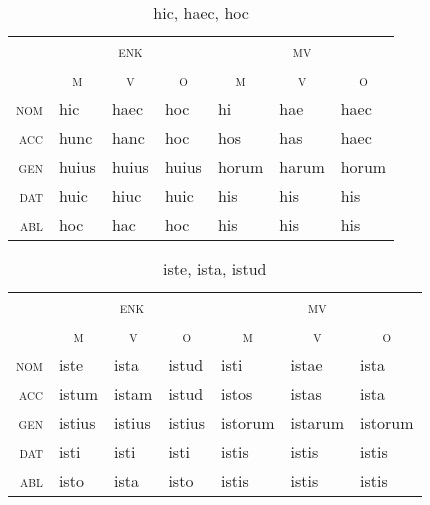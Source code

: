 \documentclass[12pt,a4paper]{article}
\begin{document}
\begin{table}[H]
\centering
\begin{tabular}{ r | l l l | l l l }
\toprule
 & \multicolumn{3}{c|}{\textsc{enk}} & \multicolumn{3}{c}{\textsc{mv}} \\
 & \multicolumn{1}{c}{\textsc{m}} & \multicolumn{1}{c}{\textsc{v}} & \multicolumn{1}{c|}{\textsc{o}} & \multicolumn{1}{c}{\textsc{m}} & \multicolumn{1}{c}{\textsc{v}} & \multicolumn{1}{c}{\textsc{o}} \\ 
\midrule
\textsc{nom} & hic   & haec  & hoc   & hi    & hae   & haec  \\
\textsc{acc} & hunc  & hanc  & hoc   & hos   & has   & haec  \\
\textsc{gen} & huius & huius & huius & horum & harum & horum \\
\textsc{dat} & huic  & hiuc  & huic  & his   & his   & his   \\
\textsc{abl} & hoc   & hac   & hoc   & his   & his   & his   \\
\bottomrule
\end{tabular}
\caption{hic, haec, hoc}
\label{tab:hic}
\end{table}

\begin{table}[H]
\centering
\begin{tabular}{ r | l l l | l l l }
\toprule
 & \multicolumn{3}{c|}{\textsc{enk}} & \multicolumn{3}{c}{\textsc{mv}} \\
 & \multicolumn{1}{c}{\textsc{m}} & \multicolumn{1}{c}{\textsc{v}} & \multicolumn{1}{c|}{\textsc{o}} & \multicolumn{1}{c}{\textsc{m}} & \multicolumn{1}{c}{\textsc{v}} & \multicolumn{1}{c}{\textsc{o}} \\ 
\midrule
\textsc{nom} & iste   & ista   & istud  & isti    & istae   & ista  \\
\textsc{acc} & istum  & istam  & istud  & istos   & istas   & ista  \\
\textsc{gen} & istius & istius & istius & istorum & istarum & istorum \\
\textsc{dat} & isti   & isti   & isti   & istis   & istis   & istis   \\
\textsc{abl} & isto   & ista   & isto   & istis   & istis   & istis   \\
\bottomrule
\end{tabular}
\caption{iste, ista, istud}
\label{tab:iste}
\end{table}
\end{document}
